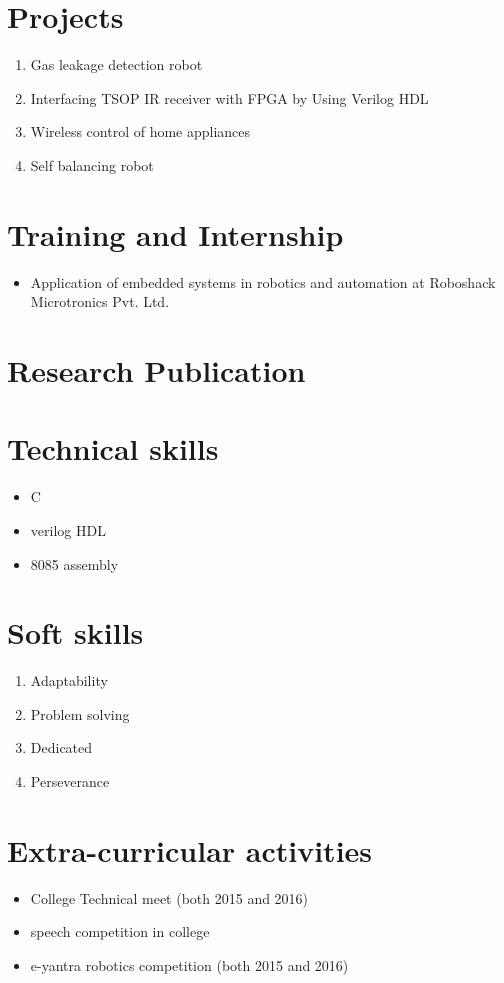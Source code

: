 \documentclass[11pt]{article}
\begin{document}
\section*{Projects}  
\begin{enumerate}
	\item Gas leakage detection robot
	\item Interfacing TSOP IR receiver with FPGA by Using Verilog HDL
	\item Wireless control of home appliances
	\item Self balancing robot
\end{enumerate}	
\section*{Training and Internship}  
\begin{itemize}
	\item	Application of embedded systems in robotics and automation at Roboshack Microtronics Pvt. Ltd. 
\end{itemize}
\section*{Research Publication}
\section*{Technical skills}   
\begin{itemize}
	\item C
	\item verilog HDL
	\item 8085 assembly
\end{itemize} 	
\section*{Soft skills}  
\begin{enumerate}
	\item Adaptability
	\item Problem solving
	\item Dedicated
	\item Perseverance
\end{enumerate}
\section*{Extra-curricular activities}  
\begin{itemize}
	\item College Technical meet (both 2015 and 2016)
	\item speech competition in college
	\item e-yantra robotics competition (both 2015 and 2016)
\end{itemize}
\end{document}
